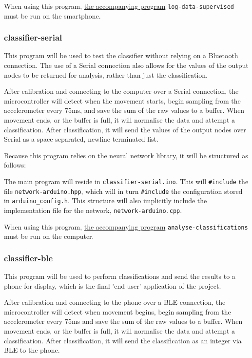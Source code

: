 \documentclass[a4paper]{article}
\begin{document}
When using this program, \hyperref[subsubsec:dc_asa_logger]{the accompanying program} \lstinline{log-data-supervised} must be run on the smartphone.

\subsubsection{classifier-serial}
\label{subsubsec:dc_msa_classifierserial}

This program will be used to test the classifier without relying on a Bluetooth connection. The use of a Serial connection also allows for the values of the output nodes to be returned for analysis, rather than just the classification.

After calibration and connecting to the computer over a Serial connection, the microcontroller will detect when the movement starts, begin sampling from the accelerometer every 75ms, and save the sum of the raw values to a buffer. When movement ends, or the buffer is full, it will normalise the data and attempt a classification. After classification, it will send the values of the output nodes over Serial as a space separated, newline terminated list.

Because this program relies on the neural network library, it will be structured as follows:

The main program will reside in \lstinline{classifier-serial.ino}. This will \lstinline{#include} the file \lstinline{network-arduino.hpp}, which will in turn \lstinline{#include} the configuration stored in \lstinline{arduino_config.h}. 
This structure will also implicitly include the implementation file for the network, \lstinline{network-arduino.cpp}.

When using this program, \hyperref[subsubsec:dc_csa_analyse]{the accompanying program} \lstinline{analyse-classifications} must be run on the computer.

\subsubsection{classifier-ble}%
\label{subsubsec:dc_msa_classifierble}

This program will be used to perform classifications and send the results to a phone for display, which is the final 'end user' application of the project.

After calibration and connecting to the phone over a BLE connection, the microcontroller will detect when movement begins, begin sampling from the accelerometer every 75ms and save the sum of the raw values to a buffer. When movement ends, or the buffer is full, it will normalise the data and attempt a classification. After classification, it will send the classification as an integer via BLE to the phone.
\end{document}
